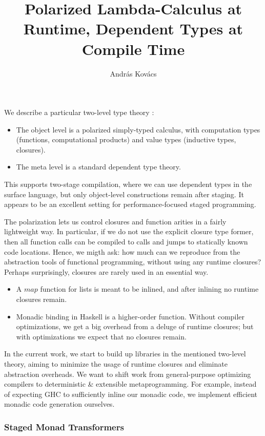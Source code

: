 \documentclass{easychair}
\title{Polarized Lambda-Calculus at Runtime, Dependent Types at Compile Time}
\author{Andr\'as Kov\'acs}
\institute{
  University of Gothenburg
  Gothenburg, Sweden \\
  \email{andrask@chalmers.se}
}
\renewcommand{\mit}[1]{{\mathit{#1}}}
\theoremstyle{remark}
\begin{document}
\maketitle

We describe a particular two-level type theory \cite{staged2ltt}:
\begin{itemize}
\item The object level is a polarized simply-typed calculus, with
      computation types (functions, computational products) and value types
      (inductive types, closures).
\item The meta level is a standard dependent type theory.
\end{itemize}
This supports two-stage compilation, where we can use dependent types in the
surface language, but only object-level constructions remain after staging. It
appears to be an excellent setting for performance-focused staged programming.

The polarization lets us control closures and function arities in a fairly
lightweight way. In particular, if we do not use the explicit closure type
former, then all function calls can be compiled to calls and jumps to statically
known code locations. Hence, we migth ask: how much can we reproduce
from the abstraction tools of functional programming, without using any runtime
closures? Perhaps surprisingly, closures are rarely used in an essential way.
\begin{itemize}
\item A $\mit{map}$ function for lists is meant to be inlined, and after
      inlining no runtime closures remain.
\item Monadic binding in Haskell is a higher-order function. Without compiler optimizations,
      we get a big overhead from a deluge of runtime closures; but with optimizations
      we expect that no closures remain.
\end{itemize}
In the current work, we start to build up libraries in the mentioned two-level
theory, aiming to minimize the usage of runtime closures and eliminate
abstraction overheads. We want to shift work from general-purpose optimizing
compilers to deterministic \& extensible metaprogramming. For example, instead
of expecting GHC to sufficiently inline our monadic code, we implement efficient
monadic code generation ourselves.

\subsubsection*{Staged Monad Transformers}
\end{document}
